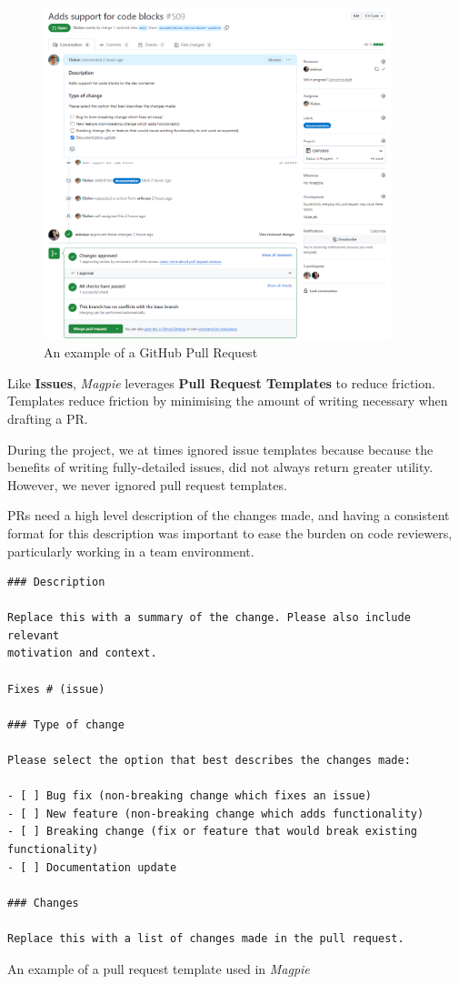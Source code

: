 \begin{figure}[htbp]
    \centering{}
    \includegraphics[width=0.90\textwidth]{images/github_pr.png}
    \caption{An example of a GitHub Pull Request}
\end{figure}

\newpage{}

Like \textbf{Issues}, \textit{Magpie} leverages \textbf{Pull Request Templates}
to reduce friction. Templates reduce friction by minimising the amount of
writing necessary when drafting a PR.

During the project, we at times ignored issue templates because because the
benefits of writing fully-detailed issues, did not always return greater
utility. However, we never ignored pull request templates.

PRs need a high level description of the changes made, and having a consistent
format for this description was important to ease the burden on code reviewers,
particularly working in a team environment.

\begin{listing}[htbp]
    \centering{}
    \begin{verbatim}
### Description

Replace this with a summary of the change. Please also include relevant
motivation and context.

Fixes # (issue)

### Type of change

Please select the option that best describes the changes made:

- [ ] Bug fix (non-breaking change which fixes an issue)
- [ ] New feature (non-breaking change which adds functionality)
- [ ] Breaking change (fix or feature that would break existing functionality)
- [ ] Documentation update

### Changes

Replace this with a list of changes made in the pull request.
    \end{verbatim}
    \caption{An example of a pull request template used in \textit{Magpie}}
\end{listing}

